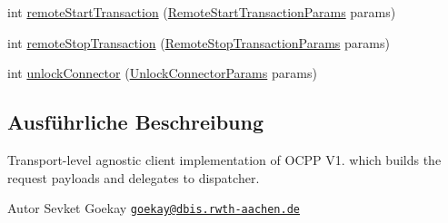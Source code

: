 \begin{DoxyCompactItemize}
\item 
int \hyperlink{classde_1_1rwth_1_1idsg_1_1steve_1_1service_1_1_charge_point_service12___client_a699443166e440f7e34a46206fb2166ef}{remote\+Start\+Transaction} (\hyperlink{classde_1_1rwth_1_1idsg_1_1steve_1_1web_1_1dto_1_1common_1_1_remote_start_transaction_params}{Remote\+Start\+Transaction\+Params} params)
\item 
int \hyperlink{classde_1_1rwth_1_1idsg_1_1steve_1_1service_1_1_charge_point_service12___client_af7c5fa9d8e585e8e061feaf76569de72}{remote\+Stop\+Transaction} (\hyperlink{classde_1_1rwth_1_1idsg_1_1steve_1_1web_1_1dto_1_1common_1_1_remote_stop_transaction_params}{Remote\+Stop\+Transaction\+Params} params)
\item 
int \hyperlink{classde_1_1rwth_1_1idsg_1_1steve_1_1service_1_1_charge_point_service12___client_aba1458ba8f5ec1e90281eb87f795e27c}{unlock\+Connector} (\hyperlink{classde_1_1rwth_1_1idsg_1_1steve_1_1web_1_1dto_1_1common_1_1_unlock_connector_params}{Unlock\+Connector\+Params} params)
\end{DoxyCompactItemize}


\subsection{Ausführliche Beschreibung}
Transport-\/level agnostic client implementation of O\+C\+P\+P V1. which builds the request payloads and delegates to dispatcher.

\begin{DoxyAuthor}{Autor}
Sevket Goekay \href{mailto:goekay@dbis.rwth-aachen.de}{\tt goekay@dbis.\+rwth-\/aachen.\+de} 
\end{DoxyAuthor}


